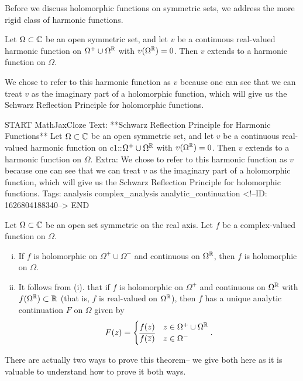 \documentclass{memoir}
\begin{document}
Before we discuss holomorphic functions on symmetric sets, we address the more rigid class of harmonic functions.

\begin{thm}
	Let \(\Omega \subset \mathbb{C}\) be an open symmetric set, and let \(v\) be a continuous real-valued harmonic function on \(\Omega^{+}\cup \Omega^{\mathbb{R}}\) with \(v(\Omega^{\mathbb{R}})=0\).
	Then \(v\) extends to a harmonic function on \(\Omega \).
\end{thm}
We chose to refer to this harmonic function as \(v\) because one can see that we can treat \(v\) as the imaginary part of a holomorphic function, which will give us the Schwarz Reflection Principle for holomorphic functions.

\begin{anki}
START
MathJaxCloze
Text: **Schwarz Reflection Principle for Harmonic Functions**
Let \(\Omega \subset \mathbb{C}\) be an open symmetric set, and let \(v\) be a continuous real-valued harmonic function on {{c1::\(\Omega^{+}\cup \Omega^{\mathbb{R}}\)}} with \(v(\Omega^{\mathbb{R}})=0\). Then \(v\) extends to a harmonic function on \(\Omega \).
Extra: We chose to refer to this harmonic function as \(v\) because one can see that we can treat \(v\) as the imaginary part of a holomorphic function, which will give us the Schwarz Reflection Principle for holomorphic functions.
Tags: analysis complex_analysis analytic_continuation
<!--ID: 1626804188340-->
END
\end{anki}


\begin{thm}
Let \(\Omega \subset \mathbb{C}\) be an open set symmetric on the real axis. Let \(f\) be a complex-valued function on \(\Omega \).
\begin{enumerate}[(i).]
	\item If \(f\) is holomorphic on \(\Omega^{+}\cup \Omega^{-}\) and continuous on \(\Omega^{\mathbb{R}}\), then \(f\) is holomorphic on \(\Omega \).
	\item It follows from (i). that if \(f\) is holomorphic on \(\Omega^{+}\) and continuous on \(\Omega^{\mathbb{R}}\) with \(f(\Omega^{\mathbb{R}}) \subset \mathbb{R}\) (that is, \(f\) is real-valued on \(\Omega^{\mathbb{R}}\)), then \(f\) has a unique analytic continuation \(F\) on \(\Omega \) given by
		\begin{align*}
			F(z) = \begin{cases}
				f(z) & z \in \Omega^{+}\cup \Omega^{\mathbb{R}}\\
				\overline{f(\overline{z})} & z \in \Omega^{-}
			\end{cases}.
		\end{align*}
\end{enumerate}
\end{thm}
There are actually two ways to prove this theorem-- we give both here as it is valuable to understand how to prove it both ways.
\end{document}
